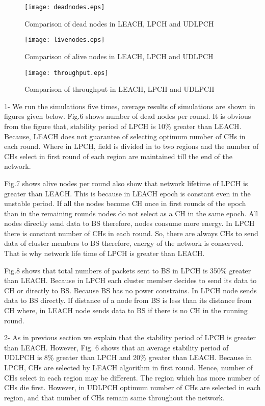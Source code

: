 \documentclass[journal]{IEEEtran}
\begin{document}
\begin{figure}[h]
\centering
\texttt{[image: deadnodes.eps]}
\caption{Comparison of dead nodes in LEACH, LPCH and UDLPCH}
\end{figure}
\begin{figure}[h]
\centering
\texttt{[image: livenodes.eps]}
\caption{Comparison of alive nodes in LEACH, LPCH and UDLPCH}
\end{figure}
\begin{figure}[h]
\centering
\texttt{[image: throughput.eps]}
\caption{Comparison of throughput in LEACH, LPCH and UDLPCH}
\end{figure}
{1}- We run the simulations five times, average results of simulations are shown in figures given below. Fig.6 shows number of dead nodes per round. It is obvious from the figure that, stability period of LPCH is 10\% greater than LEACH. Because, LEACH does not guarantee of selecting optimum number of CHs in each round. Where in LPCH, field is divided in to two regions and the number of CHs select in first round of each region are maintained till the end of the network.

Fig.7 shows alive nodes per round also show that network lifetime of LPCH is greater than LEACH. This is because in LEACH epoch is constant even in the unstable period. If all the nodes become CH once in first rounds of the epoch than in the remaining rounds nodes do not select as a CH in the same epoch. All nodes directly send data to BS therefore, nodes consume more energy. In LPCH there is constant number of CHs in each round. So, there are always CHs to send data of cluster members to BS therefore, energy of the network is conserved. That is why network life time of LPCH is greater than LEACH.

Fig.8 shows that total numbers of packets sent to BS in LPCH is 350\% greater than LEACH. Because in LPCH each cluster member decides to send its data to CH or directly to BS. Because BS has no power constrains. In LPCH node sends data to BS directly. If distance of a node from BS is less than its distance from CH where, in LEACH node sends data to BS if there is no CH in the running round.

{2}- As in previous section we explain that the stability period of LPCH is greater than LEACH. However, Fig. 6 shows that an average stability period of UDLPCH is 8\% greater than LPCH and 20\% greater than LEACH. Because in LPCH, CHs are selected by LEACH algorithm in first round. Hence, number of CHs select in each region may be different. The region which has more number of CHs die first. However, in UDLPCH optimum number of CHs are selected in each region, and that number of CHs remain same throughout the network.
\end{document}
